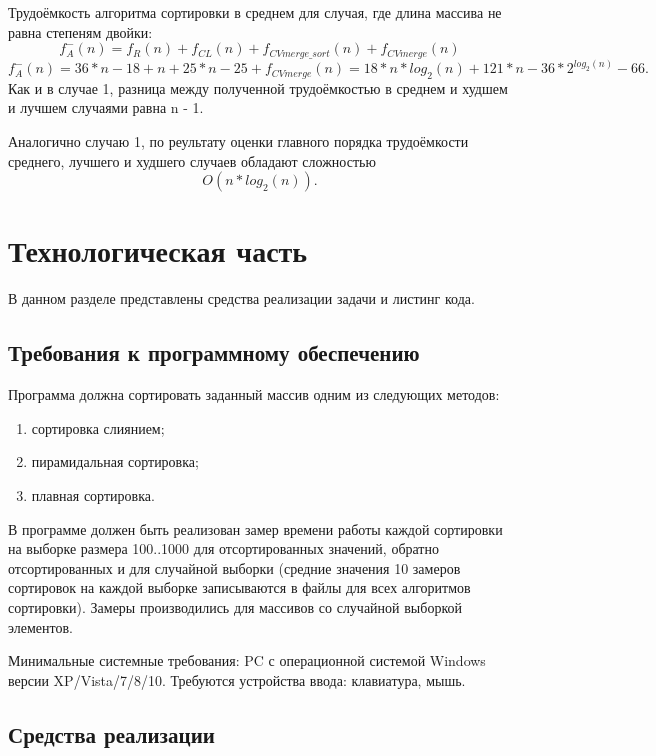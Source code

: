 \documentclass[12pt,a4paper]{scrartcl}
\begin{document}
Трудоёмкость алгоритма сортировки в среднем для случая, где длина массива не равна степеням двойки:
\begin{equation}\label{eq2.32}
f_A^-(n) = f_R(n) + f_{CL}(n) + f_{CV merge\_sort}(n) + f_{CV merge}(n)
\end{equation}
\begin{equation}\label{eq2.33}
f_A^-(n) = 36*n - 18 + n + 25*n - 25 + f_{CV merge}(n) = 18*n*log_2(n) + 121*n - 36*2^{log_2(n)} - 66.
\end{equation}
Как и в случае 1, разница между полученной трудоёмкостью в среднем и худшем и лучшем случаями равна n - 1.

Аналогично случаю 1, по реультату оценки главного порядка трудоёмкости среднего, лучшего и худшего случаев обладают сложностью 
\begin{equation}\label{eq2.34}
O(n*log_2(n)).
\end{equation}

\newpage
\section{Технологическая часть}

В данном разделе представлены средства реализации задачи и листинг кода.

\subsection{Требования к программному обеспечению}
Программа должна сортировать заданный массив одним из следующих методов:
\begin{enumerate}
	\item сортировка слиянием;
	\item пирамидальная сортировка;
	\item плавная сортировка.
\end{enumerate}

В программе должен быть реализован замер времени работы каждой сортировки на выборке размера 100..1000 для отсортированных значений, обратно отсортированных и для случайной выборки (средние значения 10 замеров сортировок на каждой выборке записываются в файлы для всех алгоритмов сортировки). Замеры производились для массивов со случайной выборкой элементов.

Минимальные системные требования: PC с операционной системой Windows версии XP/Vista/7/8/10. Требуются устройства ввода: клавиатура, мышь. 

\subsection{Средства реализации}
\end{document}
